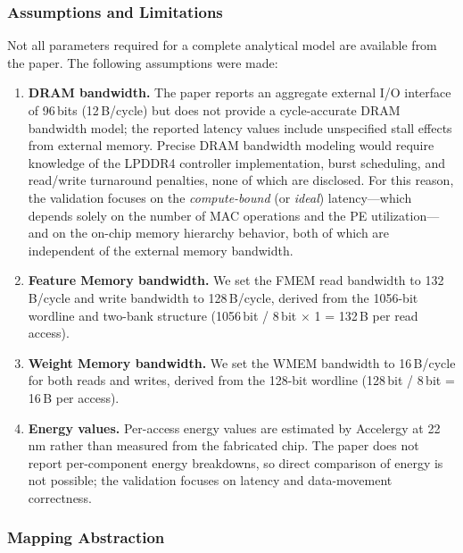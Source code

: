 \subsubsection{Assumptions and Limitations}
\label{sec:val-assumptions}

Not all parameters required for a complete analytical model are
available from the paper. The following assumptions were made:

\begin{enumerate}
  \item \textbf{DRAM bandwidth.}
        The paper reports an aggregate external I/O interface of
        96\,bits (12\,B/cycle) but does not provide a cycle-accurate
        DRAM bandwidth model; the reported latency values include
        unspecified stall effects from external memory.
        Precise DRAM bandwidth modeling would require knowledge of
        the LPDDR4 controller implementation, burst scheduling, and
        read/write turnaround penalties, none of which are disclosed.
        For this reason, the validation focuses on the
        \emph{compute-bound} (or \emph{ideal}) latency---which depends
        solely on the number of MAC operations and the PE
        utilization---and on the on-chip memory hierarchy behavior,
        both of which are independent of the external memory bandwidth.

  \item \textbf{Feature Memory bandwidth.}
        We set the FMEM read bandwidth to 132\,B/cycle and write
        bandwidth to 128\,B/cycle, derived from the 1056-bit wordline
        and two-bank structure (1056\,bit / 8\,bit $\times$ 1 = 132\,B
        per read access).

  \item \textbf{Weight Memory bandwidth.}
        We set the WMEM bandwidth to 16\,B/cycle for both reads and
        writes, derived from the 128-bit wordline
        (128\,bit / 8\,bit = 16\,B per access).

  \item \textbf{Energy values.}
        Per-access energy values are estimated by Accelergy at 22\,nm
        rather than measured from the fabricated chip.
        The paper does not report per-component energy breakdowns, so
        direct comparison of energy is not possible; the validation
        focuses on latency and data-movement correctness.
\end{enumerate}


\subsubsection{Mapping Abstraction}
\label{sec:val-mapping}

